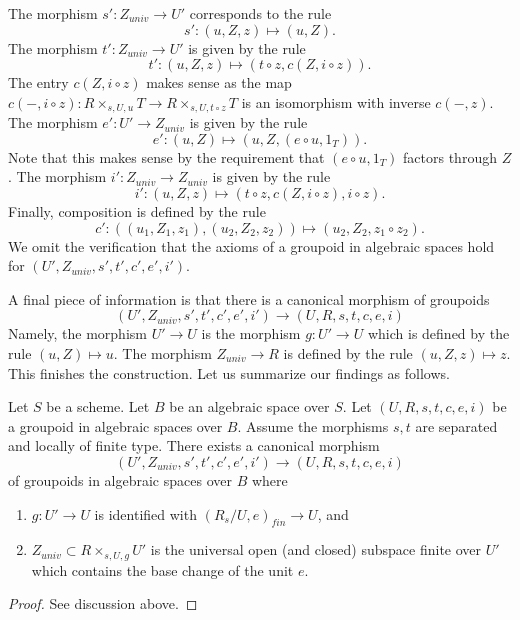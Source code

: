 \medskip\noindent
The morphism $s' : Z_{univ} \to U'$ corresponds to the rule
$$
s' : (u, Z, z) \mapsto (u, Z).
$$
The morphism $t' : Z_{univ} \to U'$ is given by the rule
$$
t' : (u, Z, z) \mapsto (t \circ z, c(Z, i \circ z)).
$$
The entry $c(Z, i \circ z)$
makes sense as the map
$c(-, i \circ z) : R \times_{s, U, u} T \to R \times_{s, U, t \circ z} T$
is an isomorphism with inverse $c(-, z)$.
The morphism $e' : U' \to Z_{univ}$ is given by the rule
$$
e' : (u, Z) \mapsto (u, Z, (e \circ u, 1_T)).
$$
Note that this makes sense by the requirement that $(e \circ u, 1_T)$
factors through $Z$.
The morphism $i' : Z_{univ} \to Z_{univ}$ is given by the rule
$$
i' : (u, Z, z) \mapsto (t \circ z, c(Z, i \circ z), i \circ z).
$$
Finally, composition is defined by the rule
$$
c' : ((u_1, Z_1, z_1), (u_2, Z_2, z_2)) \mapsto (u_2, Z_2, z_1 \circ z_2).
$$
We omit the verification that the axioms of a groupoid in algebraic
spaces hold for $(U', Z_{univ}, s', t', c', e', i')$.

\medskip\noindent
A final piece of information is that there is a canonical morphism
of groupoids
$$
(U', Z_{univ}, s', t', c', e', i')
\longrightarrow
(U, R, s, t, c, e, i)
$$
Namely, the morphism $U' \to U$ is the morphism $g : U' \to U$
which is defined by the rule $(u, Z) \mapsto u$. The morphism
$Z_{univ} \to R$ is defined by the rule $(u, Z, z) \mapsto z$.
This finishes the construction. Let us summarize our findings as
follows.

\begin{lemma}
\label{lemma-finite-part-groupoid}
Let $S$ be a scheme.
Let $B$ be an algebraic space over $S$.
Let $(U, R, s, t, c, e, i)$ be a groupoid in algebraic spaces over $B$.
Assume the morphisms $s, t$ are separated and locally of finite type.
There exists a canonical morphism
$$
(U', Z_{univ}, s', t', c', e', i')
\longrightarrow
(U, R, s, t, c, e, i)
$$
of groupoids in algebraic spaces over $B$ where
\begin{enumerate}
\item $g : U' \to U$ is identified with $(R_s/U, e)_{fin} \to U$, and
\item $Z_{univ} \subset R \times_{s, U, g} U'$ is the universal
open (and closed) subspace finite over $U'$ which contains the base
change of the unit $e$.
\end{enumerate}
\end{lemma}

\begin{proof}
See discussion above.
\end{proof}










